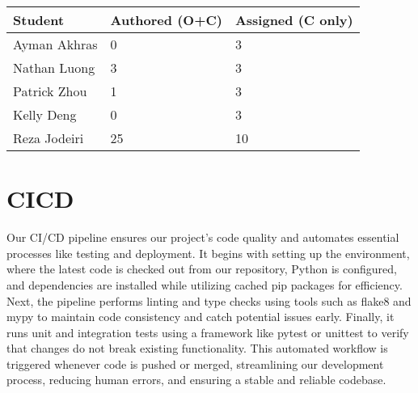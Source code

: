 \documentclass{article}
\begin{document}
\begin{table}[H]
\centering
\begin{tabular}{lll}
\toprule
\textbf{Student} & \textbf{Authored (O+C)} & \textbf{Assigned (C only)}\\
\midrule
Ayman Akhras  & 0 & 3 \\
Nathan Luong & 3 & 3 \\
Patrick Zhou & 1 & 3 \\
Kelly Deng & 0 & 3 \\
Reza Jodeiri & 25 & 10 \\
\bottomrule
\end{tabular}
\end{table}


\section{CICD}

Our CI/CD pipeline ensures our project's code quality and automates essential processes like testing and deployment. It begins with setting up the environment, where the latest code is checked out from our repository, Python is configured, and dependencies are installed while utilizing cached pip packages for efficiency. Next, the pipeline performs linting and type checks using tools such as flake8 and mypy to maintain code consistency and catch potential issues early. Finally, it runs unit and integration tests using a framework like pytest or unittest to verify that changes do not break existing functionality. This automated workflow is triggered whenever code is pushed or merged, streamlining our development process, reducing human errors, and ensuring a stable and reliable codebase.
\end{document}
